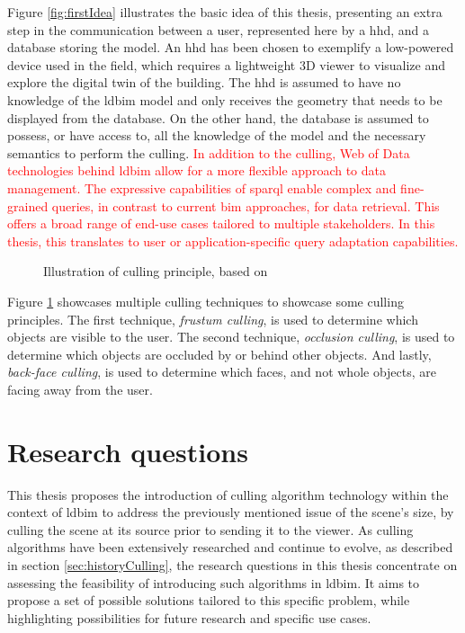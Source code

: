 Figure \ref{fig:firstIdea} illustrates the basic idea of this thesis, presenting an extra step in the communication between a user, represented here by a \ac{hhd}, and a database storing the model. An \ac{hhd} has been chosen to exemplify a low-powered device used in the field, which requires a lightweight 3D viewer to visualize and explore the digital twin of the building. The \ac{hhd} is assumed to have no knowledge of the \ac{ldbim} model and only receives the geometry that needs to be displayed from the database. On the other hand, the database is assumed to possess, or have access to, all the knowledge of the model and the necessary semantics to perform the culling. \textcolor{red}{In addition to the culling, Web of Data technologies behind \ac{ldbim} allow for a more flexible approach to data management. The expressive capabilities of \ac{sparql} enable complex and fine-grained queries, in contrast to current \ac{bim} approaches, for data retrieval. This offers a broad range of end-use cases tailored to multiple stakeholders. In this thesis, this translates to user or application-specific query adaptation capabilities.}

\begin{figure}[h]
	\centering
	
	\caption[Illustration of culling principle]{Illustration of culling principle, based on \cite{CullingPrinciples}}
	\label{fig:cullingPrinciple}
\end{figure}

Figure \ref{fig:cullingPrinciple} showcases multiple culling techniques to showcase some culling principles. The first technique, \emph{frustum culling}, is used to determine which objects are visible to the user. The second technique, \emph{occlusion culling}, is used to determine which objects are occluded by or behind other objects. And lastly, \emph{back-face culling}, is used to determine which faces, and not whole objects, are facing away from the user.

\section{Research questions}\label{sec:researchQuestions}
This thesis proposes the introduction of culling algorithm technology within the context of \ac{ldbim} to address the previously mentioned issue of the scene's size, by culling the scene at its source prior to sending it to the viewer. As culling algorithms have been extensively researched and continue to evolve, as described in section \ref{sec:historyCulling}, the research questions in this thesis concentrate on assessing the feasibility of introducing such algorithms in \ac{ldbim}. It aims to propose a set of possible solutions tailored to this specific problem, while highlighting possibilities for future research and specific use cases.

